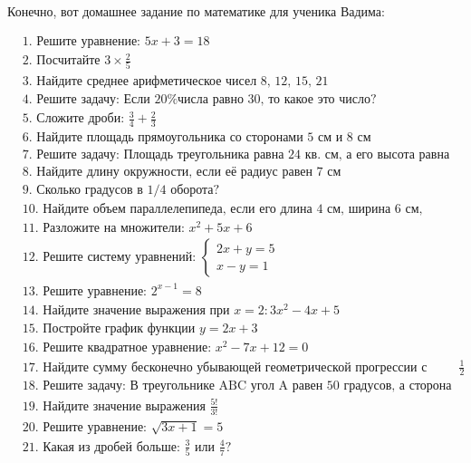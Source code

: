 \documentclass{article}
\begin{document}
Конечно, вот домашнее задание по математике для ученика Вадима:

\[
\begin{align*}
&\text{1. Решите уравнение: } 5x + 3 = 18 \\
&\text{2. Посчитайте } 3 \times \frac{2}{5} \\
&\text{3. Найдите среднее арифметическое чисел 8, 12, 15, 21} \\
&\text{4. Решите задачу: Если 20\% числа равно 30, то какое это число?} \\
&\text{5. Сложите дроби: } \frac{3}{4} + \frac{2}{3} \\
&\text{6. Найдите площадь прямоугольника со сторонами 5 см и 8 см} \\
&\text{7. Решите задачу: Площадь треугольника равна 24 кв. см, а его высота равна 6 см. Найдите основание треугольника} \\
&\text{8. Найдите длину окружности, если её радиус равен 7 см} \\
&\text{9. Сколько градусов в 1/4 оборота?} \\
&\text{10. Найдите объем параллелепипеда, если его длина 4 см, ширина 6 см, высота 10 см} \\
&\text{11. Разложите на множители: } x^2 + 5x + 6 \\
&\text{12. Решите систему уравнений: } \begin{cases} 2x + y = 5 \\ x - y = 1 \end{cases} \\
&\text{13. Решите уравнение: } 2^{x-1} = 8 \\
&\text{14. Найдите значение выражения при } x = 2: 3x^2 - 4x + 5 \\
&\text{15. Постройте график функции } y = 2x + 3 \\
&\text{16. Решите квадратное уравнение: } x^2 - 7x + 12 = 0 \\
&\text{17. Найдите сумму бесконечно убывающей геометрической прогрессии с первым членом 8 и знаменателем }\frac{1}{2} \\
&\text{18. Решите задачу: В треугольнике ABC угол A равен 50 градусов, а сторона BC равна 12 см. Найдите сторону AC} \\
&\text{19. Найдите значение выражения } \frac{5!}{3!} \\
&\text{20. Решите уравнение: } \sqrt{3x + 1} = 5 \\
&\text{21. Какая из дробей больше: } \frac{3}{5} \text{ или } \frac{4}{7}? \\

\end{align*}\]
\end{document}
